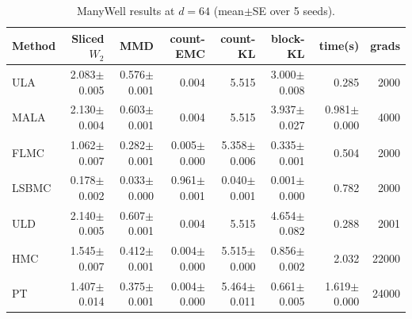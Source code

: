 \begin{table}[t]
\centering
\small
\caption{ManyWell results at $d=64$ (mean$\pm$SE over 5 seeds).}
\label{tab:manywell_d64}
\begin{tabular}{lrrrrrrr}
\toprule
Method & Sliced $W_2$ & MMD & count-EMC & count-KL & block-KL & time(s) & grads \\
\midrule
ULA & 2.083$\pm$0.005 & 0.576$\pm$0.001 & 0.004 & 5.515 & 3.000$\pm$0.008 & 0.285 & 2000 \\
MALA & 2.130$\pm$0.004 & 0.603$\pm$0.001 & 0.004 & 5.515 & 3.937$\pm$0.027 & 0.981$\pm$0.000 & 4000 \\
FLMC & 1.062$\pm$0.007 & 0.282$\pm$0.001 & 0.005$\pm$0.000 & 5.358$\pm$0.006 & 0.335$\pm$0.001 & 0.504 & 2000 \\
LSBMC & 0.178$\pm$0.002 & 0.033$\pm$0.000 & 0.961$\pm$0.001 & 0.040$\pm$0.001 & 0.001$\pm$0.000 & 0.782 & 2000 \\
ULD & 2.140$\pm$0.005 & 0.607$\pm$0.001 & 0.004 & 5.515 & 4.654$\pm$0.082 & 0.288 & 2001 \\
HMC & 1.545$\pm$0.007 & 0.412$\pm$0.001 & 0.004$\pm$0.000 & 5.515$\pm$0.000 & 0.856$\pm$0.002 & 2.032 & 22000 \\
PT & 1.407$\pm$0.014 & 0.375$\pm$0.001 & 0.004$\pm$0.000 & 5.464$\pm$0.011 & 0.661$\pm$0.005 & 1.619$\pm$0.000 & 24000 \\
\bottomrule
\end{tabular}
\end{table}